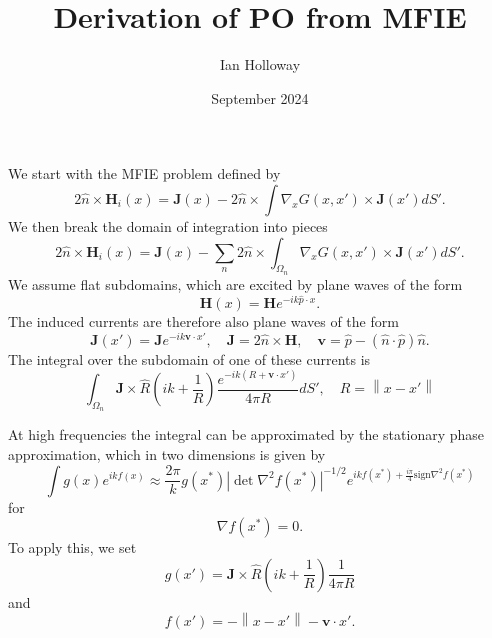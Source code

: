 \documentclass{article}
\title{Derivation of PO from MFIE}
\author{Ian Holloway}
\date{September 2024}
\newcommand{\norm}[1]{\left\lVert #1 \right\rVert}
\newcommand{\abs}[1]{\left\lvert #1 \right\rvert}
\theoremstyle{plain}
\begin{document}
\maketitle


We start with the MFIE problem defined by
\begin{equation}
	2\hat{n}\times\mathbf{H}_i(x)
	= \mathbf{J}(x)
	- 2\hat{n}\times\int \nabla_{x} G(x,x') \times \mathbf{J}(x')  dS'.
\end{equation}
We then break the domain of integration into pieces
\begin{equation}
	2\hat{n}\times\mathbf{H}_i(x)
	= \mathbf{J}(x)
	- \sum_n 2\hat{n}\times\int_{\Omega_n} \nabla_{x} G(x,x') \times \mathbf{J}(x') dS'.
\end{equation}
We assume flat subdomains, which are excited by plane waves of the form
\begin{equation}
	\mathbf{H}(x) = \mathbf{H}e^{-ik \hat{p} \cdot x}.
\end{equation}
The induced currents are therefore also plane waves of the form
\begin{equation}
	\mathbf{J}(x') = \mathbf{J}e^{-ik \mathbf{v} \cdot x'},
	\quad \mathbf{J} = 2\hat{n}\times\mathbf{H},
	\quad \mathbf{v} = \hat{p} - \left( \hat{n}\cdot\hat{p} \right)\hat{n}.
\end{equation}
The integral over the subdomain of one of these currents is
\begin{equation}
	\int_{\Omega_n}
	\mathbf{J} \times \hat{R}
	\left( ik + \frac{1}{R} \right)
	\frac{e^{-ik\left(R + \mathbf{v} \cdot x'\right)}}{4\pi R} dS',
	\quad R = \norm{x-x'}
\end{equation}



At high frequencies the integral can be approximated by the stationary phase approximation,
which in two dimensions is given by
\begin{equation}
	\int g(x) e^{ikf(x)}
	\approx \frac{2\pi}{k} g(x^*)
	\abs{\det \nabla^2 f(x^*)}^{-1/2}
	e^{ikf(x^*) + \frac{i\pi}{4}\text{sign}\nabla^2 f(x^*)}
\end{equation}
for
\begin{equation}
	\nabla f(x^*) = 0.
\end{equation}
To apply this, we set
\begin{equation}
	g(x') = 
	\mathbf{J} \times \hat{R}
	\left( ik + \frac{1}{R} \right)
	\frac{1}{4\pi R}
\end{equation}
and
\begin{equation}
	f(x') = -\norm{x-x'} - \mathbf{v}\cdot x'.
\end{equation}
\end{document}
